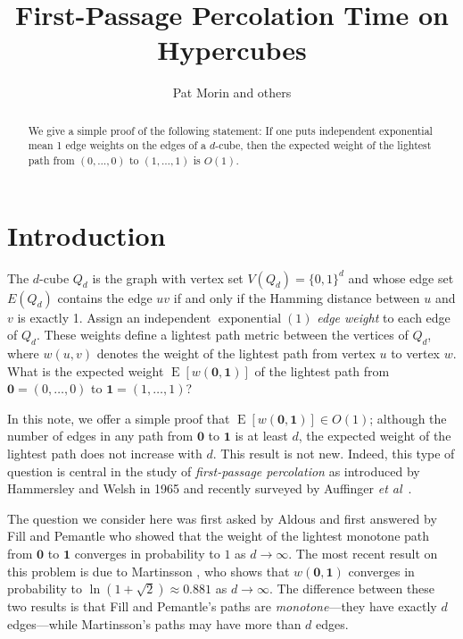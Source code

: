 \documentclass[a4paper,UKenglish]{lipics-v2016}
\title{First-Passage Percolation Time on Hypercubes}
\author{Pat Morin and others}
\DeclareMathOperator{\E}{E}
\DeclareMathOperator{\exponential}{exponential}
\newcommand{\zero}{\mathbf{0}}
\newcommand{\one}{\mathbf{1}}
\newcommand{\etal}{\emph{et al}}
\begin{document}
\maketitle

\begin{abstract}
We give a simple proof of the following statement: If one puts independent
exponential mean 1 edge weights on the edges of a $d$-cube, then the
expected weight of the lightest path from $(0,\ldots,0)$ to $(1,\ldots,1)$
is $O(1)$. 
\end{abstract}

\section{Introduction}

The $d$-cube $Q_d$ is the graph with vertex set $V(Q_d)=\{0,1\}^d$
and whose edge set $E(Q_d)$ contains the edge $uv$ if and only if the
Hamming distance between $u$ and $v$ is exactly 1.  Assign an independent
$\exponential(1)$ \emph{edge weight} to each edge of $Q_d$.  These weights
define a lightest path metric between the vertices of $Q_d$, where
$w(u,v)$ denotes the weight of the lightest path from vertex $u$ to vertex
$w$.  What is the expected weight $\E[w(\mathbf{0},\mathbf{1})]$ of the
lightest path from $\mathbf{0}=(0,\ldots,0)$ to $\mathbf{1}=(1,\ldots,1)$?

In this note, we offer a simple proof that $\E[w(\mathbf{0},\mathbf{1})]
\in O(1)$;  although the number of edges in any path from $\mathbf{0}$
to $\mathbf{1}$ is at least $d$, the expected weight of the lightest path
does not increase with $d$.  This result is not new.  Indeed, this type of
question is central in the study of \emph{first-passage percolation} as
introduced by Hammersley and Welsh in 1965 \cite{hammersley.welsh:first}
and recently surveyed by Auffinger \etal\ \cite{auffinger.damron.ea:50}.

The question we consider here was first asked by Aldous
\cite[Section~G7]{aldous:probability} and first answered by Fill and
Pemantle \cite{fill.pemantle:percolation} who showed that the
weight of the lightest monotone path from $\zero$ to $\one$ converges
in probability to $1$ as $d\rightarrow\infty$.  The most recent result
on this problem is due to Martinsson \cite{martinsson:unoriented},
who shows that $w(\mathbf{0},\mathbf{1})$ converges in probability to
$\ln(1+\sqrt{2})\approx 0.881$ as $d\rightarrow\infty$.  The difference
between these two results is that Fill and Pemantle's paths are \emph{monotone}---they have exactly $d$ edges---while Martinsson's paths may have more than
$d$ edges.
\end{document}
